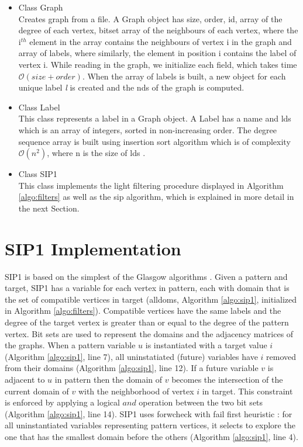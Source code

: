 \documentclass{l4proj}
\begin{document}
\begin{itemize}
\item Class Graph\\
Creates \gls{graph} from a file. A Graph object has size, order, id, array of the degree of each vertex, bitset array of the neighbours of each vertex, where the i$^{th}$ element in the array contains the neighbours of vertex i in the graph and array of labels, where similarly, the element in position i contains the label of vertex i. While reading in the graph, we initialize each field, which takes time $\mathcal{O}(size+order)$. When the array of labels is built, a new object for each unique label \textit{l} is created and the \gls{nds} of the graph is computed.
\item Class Label\\
This class represents a label in a Graph object. A Label has a name and \gls{lds} which is an array of integers, sorted in non-increasing order. The degree sequence array is built using insertion sort algorithm which is of complexity $\mathcal{O}(n^{2})$, where n is the size of \gls{lds} \cite{Cormen:2001:IA:580470}.
\item Class SIP1\\
This class implements the light filtering procedure displayed in Algorithm \ref{algo:filters} as well as the \gls{sip} algorithm, which is explained in more detail in the next Section.
\end{itemize}

\section{SIP1 Implementation}
\label{sec:sip1}
SIP1 is based on the simplest of the Glasgow algorithms \cite{CP2015}. Given a \gls{pattern} and \gls{target}, SIP1 has a variable for each vertex in \gls{pattern}, each with domain that is the set of compatible vertices in \gls{target} (alldoms, Algorithm \ref{algo:sip1}, initialized in Algorithm \ref{algo:filters}). Compatible vertices have the same labels and the degree of the target vertex is greater than or equal to the degree of the pattern vertex. Bit sets are used to represent the domains and the adjacency matrices of the graphs. When a pattern variable $u$ is instantiated with a target value $i$ (Algorithm \ref{algo:sip1}, line 7), all uninstatiated (future) variables have $i$ removed from their domains (Algorithm \ref{algo:sip1}, line 12). If a future variable $v$ is adjacent to $u$ in \gls{pattern} then the domain of $v$ becomes the intersection of the current domain of $v$ with the neighborhood of vertex $i$ in \gls{target}. This constraint is enforced by applying a logical $and$ operation between the two bit sets (Algorithm \ref{algo:sip1}, line 14). SIP1 uses \gls{forwcheck} with fail first heuristic \cite{haralickElliot:1980}: for all uninstantiated variables representing pattern vertices, it selects to explore the one that has the smallest domain before the others (Algorithm \ref{algo:sip1}, line 4).
\end{document}
